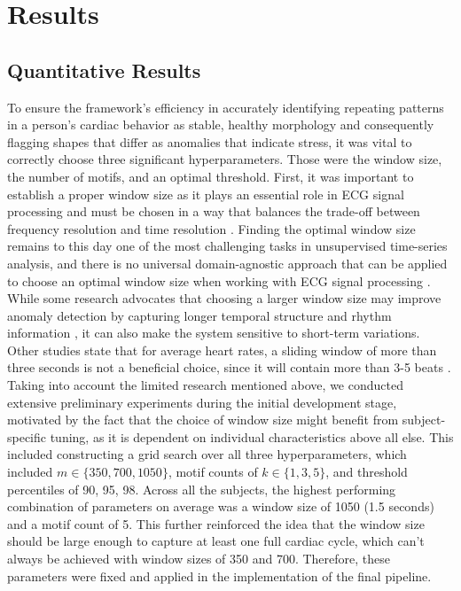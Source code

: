 \documentclass[conference,10pt]{IEEEtran}
\begin{document}
\section{Results}

\subsection{Quantitative Results}

To ensure the framework’s efficiency in accurately identifying repeating patterns in a person’s cardiac behavior as stable, healthy morphology and consequently flagging shapes that differ as anomalies that indicate stress, it was vital to correctly choose three significant hyperparameters. Those were the window size, the number of motifs, and an optimal threshold.
First, it was important to establish a proper window size as it plays an essential role in ECG signal processing and must be chosen in a way that balances the trade-off between frequency resolution and time resolution \cite{r19}.  
Finding the optimal window size remains to this day one of the most challenging tasks in unsupervised time-series analysis, and there is no universal domain-agnostic approach that can be applied to choose an optimal window size when working with ECG signal processing  \cite{r20}. 
While some research advocates that choosing a larger window size may improve anomaly detection by capturing longer temporal structure and rhythm information \cite{r21,r22}, it can also make the system sensitive to short-term variations. Other studies state that for average heart rates, a sliding window of more than three seconds is not a beneficial choice, since it will contain more than 3-5 beats \cite{r23}. 
Taking into account the limited research mentioned above, we conducted extensive preliminary experiments during the initial development stage, motivated by the fact that the choice of window size might benefit from subject-specific tuning, as it is dependent on individual characteristics above all else. This included constructing a grid search over all three hyperparameters, which included $m \in \{350, 700, 1050\}$, motif counts of $k \in \{1, 3, 5\}$, and threshold percentiles of 90, 95, 98.  
Across all the subjects, the highest performing combination of parameters on average was a window size of 1050 (1.5 seconds) and a motif count of 5. This further reinforced the idea that the window size should be large enough to capture at least one full cardiac cycle, which can’t always be achieved with window sizes of 350 and 700. Therefore, these parameters were fixed and applied in the implementation of the final pipeline. 
\end{document}
